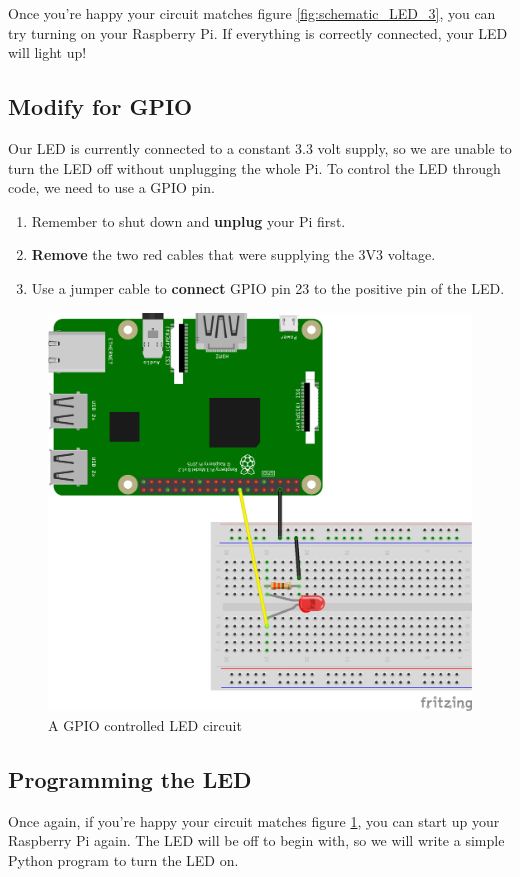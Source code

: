 		Once you're happy your circuit matches figure \ref{fig:schematic_LED_3}, you can try turning on your Raspberry Pi. If everything is correctly connected, your LED will light up!
		
	\subsection{Modify for GPIO}
	
			Our LED is currently connected to a constant 3.3 volt supply, so we are unable to turn the LED off without unplugging the whole Pi. To control the LED through code, we need to use a GPIO pin.
	
			\begin{enumerate}[nosep]
				\item Remember to shut down and \textbf{unplug} your Pi first.
				\item \textbf{Remove} the two red cables that were supplying the 3V3 voltage.
				\item Use a jumper cable to \textbf{connect} GPIO pin 23 to the positive pin of the LED.
			\end{enumerate}	
		
			\begin{figure}[h]
				\centering
				\includegraphics[width=0.6\linewidth]{McrRaspJam/011_Motors/1_LED/schematic_LED_4}
				\caption{A GPIO controlled LED circuit}
				\label{fig:schematic_LED_4}
			\end{figure}
		
	\subsection{Programming the LED}
		
			Once again, if you're happy your circuit matches figure \ref{fig:schematic_LED_4}, you can start up your Raspberry Pi again.
			The LED will be off to begin with, so we will write a simple Python program to turn the LED on.
			

